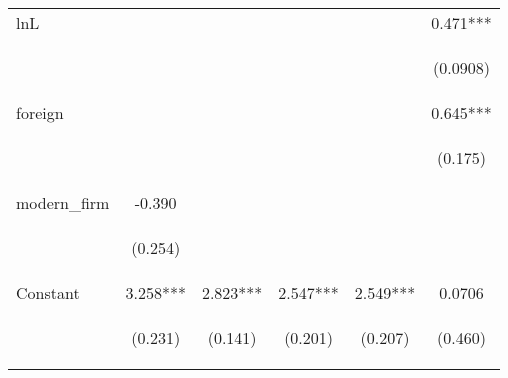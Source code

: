 \begin{center}
\begin{tabular}{lccccc}
lnL &  &  &  &  & 0.471*** \\
\vspace{4pt} & \begin{footnotesize}\end{footnotesize} & \begin{footnotesize}\end{footnotesize} & \begin{footnotesize}\end{footnotesize} & \begin{footnotesize}\end{footnotesize} & \begin{footnotesize}(0.0908)\end{footnotesize} \\
foreign &  &  &  &  & 0.645*** \\
\vspace{4pt} & \begin{footnotesize}\end{footnotesize} & \begin{footnotesize}\end{footnotesize} & \begin{footnotesize}\end{footnotesize} & \begin{footnotesize}\end{footnotesize} & \begin{footnotesize}(0.175)\end{footnotesize} \\
modern\_firm & -0.390 &  &  &  &  \\
\vspace{4pt} & \begin{footnotesize}(0.254)\end{footnotesize} & \begin{footnotesize}\end{footnotesize} & \begin{footnotesize}\end{footnotesize} & \begin{footnotesize}\end{footnotesize} & \begin{footnotesize}\end{footnotesize} \\
Constant & 3.258*** & 2.823*** & 2.547*** & 2.549*** & 0.0706 \\
 & \begin{footnotesize}(0.231)\end{footnotesize} & \begin{footnotesize}(0.141)\end{footnotesize} & \begin{footnotesize}(0.201)\end{footnotesize} & \begin{footnotesize}(0.207)\end{footnotesize} & \begin{footnotesize}(0.460)\end{footnotesize} \\

\end{tabular}
\end{center}

